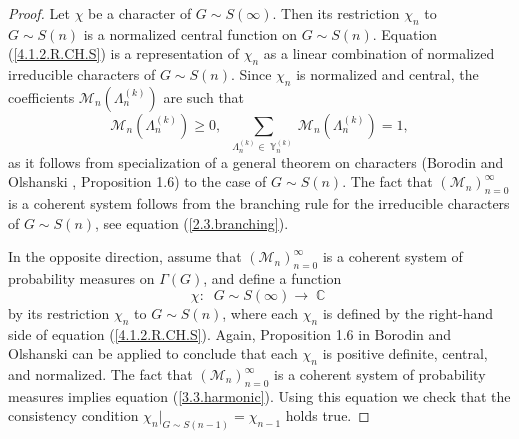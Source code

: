 \documentclass[12pt]{amsart}
\theoremstyle{definition}
\numberwithin{equation}{section}
\DeclareMathOperator{\Y}{\mathbb{Y}}
\DeclareMathOperator{\C}{\mathbb{C}}
\begin{document}
\begin{proof}Let $\chi$ be a character of $G\sim S(\infty)$. Then its restriction $\chi_n$ to $G\sim S(n)$ is a normalized central function on $G\sim S(n)$. Equation (\ref{4.1.2.R.CH.S}) is a
representation of $\chi_n$ as a linear combination of normalized irreducible characters of $G\sim S(n)$. Since $\chi_n$ is normalized and central,
the coefficients $\mathcal{M}_n\left(\Lambda_n^{(k)}\right)$ are such that
$$
\mathcal{M}_n\left(\Lambda_n^{(k)}\right)\geq 0,\;\;\sum\limits_{\Lambda_n^{(k)}\in\Y_n^{(k)}}\mathcal{M}_n\left(\Lambda_n^{(k)}\right)=1,
$$
as it follows from specialization of a general theorem on characters (Borodin and Olshanski \cite{BorodinOlshanskiBook}, Proposition 1.6) to the case of $G\sim S(n)$. The fact that $\left(\mathcal{M}_n\right)_{n=0}^{\infty}$ is a coherent system  follows from the branching rule for the irreducible characters of $G\sim S(n)$, see equation (\ref{2.3.branching}).


In the opposite direction, assume that $\left(\mathcal{M}_n\right)_{n=0}^{\infty}$ is a coherent system of probability measures on $\Gamma\left(G\right)$, and define a function
$$
\chi:\;\; G\sim S(\infty)\rightarrow\C
$$
by its restriction  $\chi_n$ to $G\sim S(n)$,
where each $\chi_n$ is defined by the right-hand side of equation (\ref{4.1.2.R.CH.S}).
Again, Proposition 1.6 in Borodin and Olshanski \cite{BorodinOlshanskiBook} can be applied to conclude that each $\chi_n$ is positive definite, central, and normalized. The fact that $\left(\mathcal{M}_n\right)_{n=0}^{\infty}$ is a coherent system of probability measures implies equation (\ref{3.3.harmonic}). Using this equation we check that the consistency condition
$\chi_n |_{G\sim S(n-1)}=\chi_{n-1}$ holds true.
\end{proof}
\end{document}
